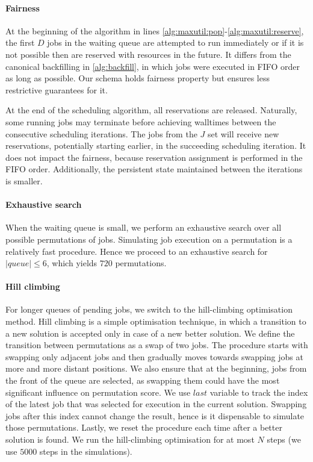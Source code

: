 \documentclass[thesis-en.tex]{subfiles}
\begin{document}
\paragraph{Fairness}
At the beginning of the algorithm in lines \ref{alg:maxutil:pop}-\ref{alg:maxutil:reserve}, the first $D$ jobs in the waiting queue are attempted to run immediately or if it is not possible then are reserved with resources in the future. It differs from the canonical backfilling in \autoref{alg:backfill}, in which jobs were executed in FIFO order as long as possible. Our schema holds fairness property but ensures less restrictive guarantees for it.

At the end of the scheduling algorithm, all reservations are released. Naturally, some running jobs may terminate before achieving walltimes between the consecutive scheduling iterations. The jobs from the $J$ set will receive new reservations, potentially starting earlier, in the succeeding scheduling iteration. It does not impact the fairness, because reservation assignment is performed in the FIFO order. Additionally, the persistent state maintained between the iterations is smaller.

\paragraph{Exhaustive search}
When the waiting queue is small, we perform an exhaustive search over all possible permutations of jobs. Simulating job execution on a permutation is a relatively fast procedure. Hence we proceed to an exhaustive search for $|queue| \leq 6$, which yields $720$ permutations.

\paragraph{Hill climbing}
For longer queues of pending jobs, we switch to the hill-climbing optimisation method. Hill climbing is a simple optimisation technique, in which a transition to a new solution is accepted only in case of a new better solution. We define the transition between permutations as a swap of two jobs. The procedure starts with swapping only adjacent jobs and then gradually moves towards swapping jobs at more and more distant positions. We also ensure that at the beginning, jobs from the front of the queue are selected, as swapping them could have the most significant influence on permutation score. We use $last$ variable to track the index of the latest job that was selected for execution in the current solution. Swapping jobs after this index cannot change the result, hence is it dispensable to simulate those permutations. Lastly, we reset the procedure each time after a better solution is found. We run the hill-climbing optimisation for at most $N$ steps (we use $5000$ steps in the simulations).
\end{document}
